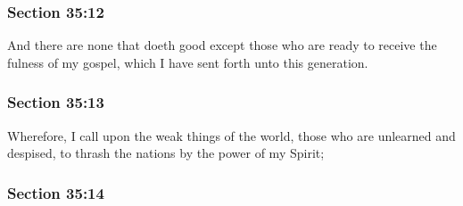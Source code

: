 
	\subsubsection{Section 35:12} %
		\label{DC35-12}

		And there are none that doeth good except those who are ready to receive the fulness of my gospel, which I have sent forth unto this generation.


	\subsubsection{Section 35:13} %
		\label{DC35-13}

		Wherefore, I call upon the weak things of the world, those who are unlearned and despised, to thrash the nations by the power of my Spirit;


	\subsubsection{Section 35:14} %
		\label{DC35-14}

